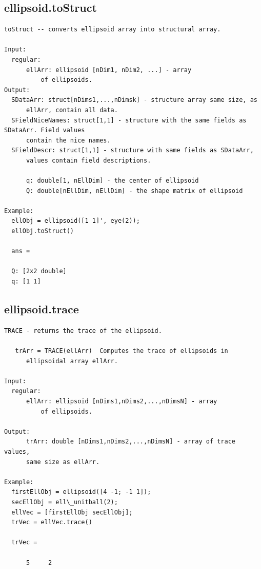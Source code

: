 \documentclass[letterpaper,10pt,english]{sphinxmanual}
\begin{document}
\subsection{ellipsoid.toStruct}
\label{chap_functions:ellipsoid-tostruct}
\begin{Verbatim}[commandchars=\\\{\}]
toStruct -- converts ellipsoid array into structural array.

Input:
  regular:
      ellArr: ellipsoid [nDim1, nDim2, ...] - array
          of ellipsoids.
Output:
  SDataArr: struct[nDims1,...,nDimsk] - structure array same size, as
      ellArr, contain all data.
  SFieldNiceNames: struct[1,1] - structure with the same fields as SDataArr. Field values
      contain the nice names.
  SFieldDescr: struct[1,1] - structure with same fields as SDataArr,
      values contain field descriptions.

      q: double[1, nEllDim] - the center of ellipsoid
      Q: double[nEllDim, nEllDim] - the shape matrix of ellipsoid

Example:
  ellObj = ellipsoid([1 1]', eye(2));
  ellObj.toStruct()

  ans =

  Q: [2x2 double]
  q: [1 1]
\end{Verbatim}


\subsection{ellipsoid.trace}
\label{chap_functions:ellipsoid-trace}
\begin{Verbatim}[commandchars=\\\{\}]
TRACE - returns the trace of the ellipsoid.

   trArr = TRACE(ellArr)  Computes the trace of ellipsoids in
      ellipsoidal array ellArr.

Input:
  regular:
      ellArr: ellipsoid [nDims1,nDims2,...,nDimsN] - array
          of ellipsoids.

Output:
      trArr: double [nDims1,nDims2,...,nDimsN] - array of trace values,
      same size as ellArr.

Example:
  firstEllObj = ellipsoid([4 -1; -1 1]);
  secEllObj = ell\_unitball(2);
  ellVec = [firstEllObj secEllObj];
  trVec = ellVec.trace()

  trVec =

      5     2
\end{Verbatim}
\end{document}
